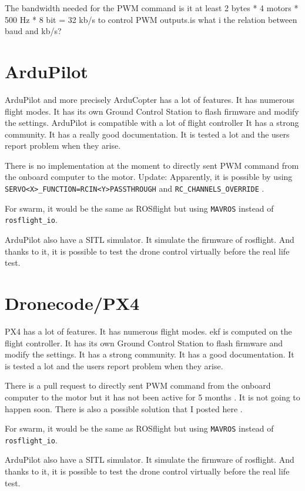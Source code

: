 The bandwidth needed for the PWM command is it at least
2 bytes * 4 motors * 500 Hz * 8 bit = 32 kb/s to control PWM outputs.{\color{red}is what i the relation between baud and kb/s?}

\section{ArduPilot}
ArduPilot and more precisely ArduCopter has a lot of features.
It has numerous flight modes.
It has its own Ground Control Station to flash firmware and modify the settings.
ArduPilot is compatible with a lot of flight controller
It has a strong community.
It has a really good documentation.
It is tested a lot and the users report problem when they arise.

There is no implementation at the moment to directly sent PWM command from the onboard computer to the motor.
{\color{blue} Update: Apparently, it is possible by using \texttt{SERVO<X>\_FUNCTION=RCIN<Y>PASSTHROUGH} and \texttt{RC\_CHANNELS\_OVERRIDE}}
\cite{github_ardupilot_11859}.

For swarm, it would be the same as ROSflight but using \texttt{MAVROS} instead of \texttt{rosflight\_io}.

ArduPilot also have a SITL simulator. It simulate the firmware of rosflight. And thanks to it, it is possible to test the drone control virtually before the real life test.

\section{Dronecode/PX4}
PX4 has a lot of features.
It has numerous flight modes.
\Gls{ekf} is computed on the flight controller.
It has its own Ground Control Station to flash firmware and modify the settings.
It has a strong community.
It has a good documentation.
It is tested a lot and the users report problem when they arise.

There is a pull request to directly sent PWM command from the onboard computer to the motor but it has not been active for 5 months \cite{github_px4_10863}. It is not going to happen soon.
There is also a possible solution that I posted here \cite{px4_low_level_control}.



For swarm, it would be the same as ROSflight but using \texttt{MAVROS} instead of \texttt{rosflight\_io}.

ArduPilot also have a SITL simulator. It simulate the firmware of rosflight. And thanks to it, it is possible to test the drone control virtually before the real life test.


